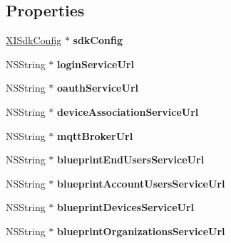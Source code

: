 \subsection*{Properties}
\begin{DoxyCompactItemize}
\item 
\hypertarget{interface_x_i_services_config_a07a675ddf2b1dda5c4ba883a2c6b82ac}{}\label{interface_x_i_services_config_a07a675ddf2b1dda5c4ba883a2c6b82ac} 
\hyperlink{class_x_i_sdk_config}{X\+I\+Sdk\+Config} $\ast$ {\bfseries sdk\+Config}
\item 
\hypertarget{interface_x_i_services_config_ab5bf8c045de5bb9f2a200b3a9b3fe52f}{}\label{interface_x_i_services_config_ab5bf8c045de5bb9f2a200b3a9b3fe52f} 
N\+S\+String $\ast$ {\bfseries login\+Service\+Url}
\item 
\hypertarget{interface_x_i_services_config_a4ad9be72b5c7a53e9193a851e258d2e4}{}\label{interface_x_i_services_config_a4ad9be72b5c7a53e9193a851e258d2e4} 
N\+S\+String $\ast$ {\bfseries oauth\+Service\+Url}
\item 
\hypertarget{interface_x_i_services_config_a0edc4030409d6e361fe7daebaf457af0}{}\label{interface_x_i_services_config_a0edc4030409d6e361fe7daebaf457af0} 
N\+S\+String $\ast$ {\bfseries device\+Association\+Service\+Url}
\item 
\hypertarget{interface_x_i_services_config_a5df1eebc3ba96a1d618d5c6ae5ad9d5f}{}\label{interface_x_i_services_config_a5df1eebc3ba96a1d618d5c6ae5ad9d5f} 
N\+S\+String $\ast$ {\bfseries mqtt\+Broker\+Url}
\item 
\hypertarget{interface_x_i_services_config_a12344f55d0dd4c3788cbb189aa6ca140}{}\label{interface_x_i_services_config_a12344f55d0dd4c3788cbb189aa6ca140} 
N\+S\+String $\ast$ {\bfseries blueprint\+End\+Users\+Service\+Url}
\item 
\hypertarget{interface_x_i_services_config_a6495fddef07cf235828223a0c41fce9d}{}\label{interface_x_i_services_config_a6495fddef07cf235828223a0c41fce9d} 
N\+S\+String $\ast$ {\bfseries blueprint\+Account\+Users\+Service\+Url}
\item 
\hypertarget{interface_x_i_services_config_a7fce70bc1566d41dbcce05125b22adcd}{}\label{interface_x_i_services_config_a7fce70bc1566d41dbcce05125b22adcd} 
N\+S\+String $\ast$ {\bfseries blueprint\+Devices\+Service\+Url}
\item 
\hypertarget{interface_x_i_services_config_a527f7ff30630eb219e6189307c94a3aa}{}\label{interface_x_i_services_config_a527f7ff30630eb219e6189307c94a3aa} 
N\+S\+String $\ast$ {\bfseries blueprint\+Organizations\+Service\+Url}

\end{DoxyCompactItemize}

